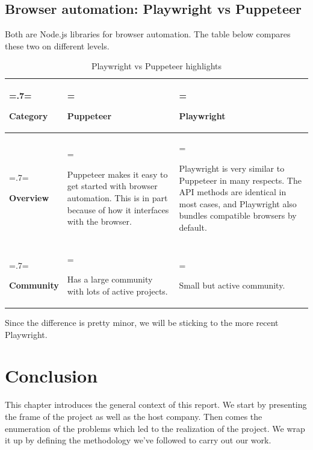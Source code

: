 \subsection{Browser automation: Playwright vs Puppeteer}
Both are Node.js libraries for browser automation. The table below compares these two on different levels.
\begin{table}[H]
	\renewcommand{\arraystretch}{1.5}%
	\caption{Playwright vs Puppeteer highlights}
	\centering
	\medskip
	\begin{tabularx}{1\textwidth} {
			| >{\hsize=.7\hsize\linewidth=\hsize\raggedright\arraybackslash}X
			| >{\hsize=1.15\hsize\linewidth=\hsize\raggedright\arraybackslash}X
			| >{\hsize=1.15\hsize\linewidth=\hsize\raggedright\arraybackslash}X |}
		\hline
		\rowcolor{primary} \textbf {Category} & \textbf {Puppeteer}                                                                                                            & \textbf {Playwright}                                                                                                                                               \\
		\hline
		\textbf {Overview}                    & Puppeteer makes it easy to get started with browser automation. This is in part because of how it interfaces with the browser. & Playwright is very similar to Puppeteer in many respects. The API methods are identical in most cases, and Playwright also bundles compatible browsers by default. \\
		\hline
		\textbf {Community}                   & Has a large community with lots of active projects.                                                                            & Small but active community.                                                                                                                                        \\
		\hline
	\end{tabularx}
\end{table}
Since the difference is pretty minor, we will be sticking to the more recent Playwright.

\setcounter{secnumdepth}{0} %
\section{Conclusion}
This chapter introduces the general context of this report. We start by presenting the frame of the project as well as the host company. Then comes the enumeration of the problems which led to the realization of the project. We wrap it up by defining the methodology we’ve followed to carry out our work. \citep{test1}
